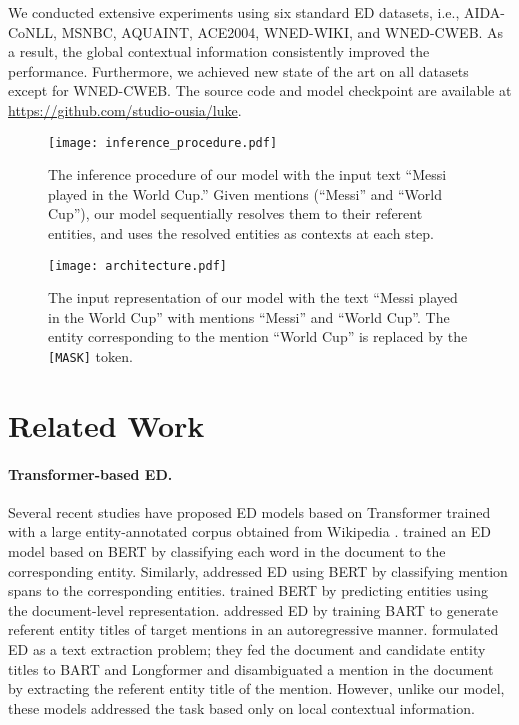 \documentclass[11pt]{article}
\begin{document}
We conducted extensive experiments using six standard ED datasets, i.e., AIDA-CoNLL, MSNBC, AQUAINT, ACE2004, WNED-WIKI, and WNED-CWEB.
As a result, the global contextual information consistently improved the performance.
Furthermore, we achieved new state of the art on all datasets except for WNED-CWEB.
The source code and model checkpoint are available at \url{https://github.com/studio-ousia/luke}.

\begin{figure}[t]
  \centering
  \texttt{[image: inference\_procedure.pdf]}
  \caption{The inference procedure of our model with the input text ``Messi played in the World Cup.''  Given mentions (``Messi'' and ``World Cup''), our model sequentially resolves them to their referent entities, and uses the resolved entities as contexts at each step.}
  \label{fig:inference}
\end{figure}

\begin{figure*}[t]
  \centering
  \texttt{[image: architecture.pdf]}
  \caption{The input representation of our model with the text ``Messi played in the World Cup'' with mentions ``Messi'' and ``World Cup''. The entity corresponding to the mention ``World Cup'' is replaced by the \texttt{[MASK]} token.}
  \label{fig:input-representations}
\end{figure*}

\section{Related Work}
\label{sec:related-work}

\paragraph{Transformer-based ED.} Several recent studies have proposed ED models based on Transformer \cite{NIPS2017_7181} trained with a large entity-annotated corpus obtained from Wikipedia \cite{Broscheit2019InvestigatingLinking,Ling2020LearningText,fevry2020empirical,cao2021autoregressive,barba-et-al-2022}.
 trained an ED model based on BERT by classifying each word in the document to the corresponding entity.
Similarly,  addressed ED using BERT by classifying mention spans to the corresponding entities.
 trained BERT by predicting entities using the document-level representation.
 addressed ED by training BART \cite{Lewis2020} to generate referent entity titles of target mentions in an autoregressive manner.
 formulated ED as a text extraction problem; they fed the document and candidate entity titles to BART and Longformer \cite{beltagy2020longformer} and disambiguated a mention in the document by extracting the referent entity title of the mention.
However, unlike our model, these models addressed the task based only on local contextual information.
\end{document}

